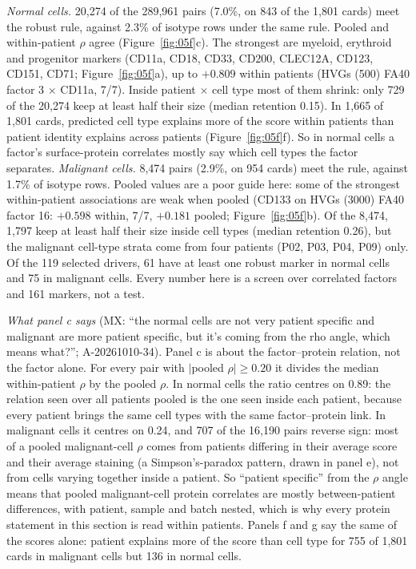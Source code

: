 \emph{Normal cells.} 20,274 of the 289,961 pairs (7.0\%, on 843 of the 1,801 cards) meet the robust rule, against 2.3\% of isotype rows under the same rule. Pooled and within-patient $\rho$ agree (Figure~\ref{fig:05f}c). The strongest are myeloid, erythroid and progenitor markers (CD11a, CD18, CD33, CD200, CLEC12A, CD123, CD151, CD71; Figure~\ref{fig:05f}a), up to $+0.809$ within patients (HVGs (500) FA40 factor 3 $\times$ CD11a, 7/7). Inside patient $\times$ cell type most of them shrink: only 729 of the 20,274 keep at least half their size (median retention 0.15). In 1,665 of 1,801 cards, predicted cell type explains more of the score within patients than patient identity explains across patients (Figure~\ref{fig:05f}f). So in normal cells a factor's surface-protein correlates mostly say which cell types the factor separates. \emph{Malignant cells.} 8,474 pairs (2.9\%, on 954 cards) meet the rule, against 1.7\% of isotype rows. Pooled values are a poor guide here: some of the strongest within-patient associations are weak when pooled (CD133 on HVGs (3000) FA40 factor 16: $+0.598$ within, 7/7, $+0.181$ pooled; Figure~\ref{fig:05f}b). Of the 8,474, 1,797 keep at least half their size inside cell types (median retention 0.26), but the malignant cell-type strata come from four patients (P02, P03, P04, P09) only. Of the 119 selected drivers, 61 have at least one robust marker in normal cells and 75 in malignant cells. Every number here is a screen over correlated factors and 161 markers, not a test.

\emph{What panel c says} (MX: ``the normal cells are not very patient specific and malignant are more patient specific, but it's coming from the rho angle, which means what?''; A-20261010-34). Panel c is about the factor--protein relation, not the factor alone. For every pair with $|$pooled $\rho| \geq 0.20$ it divides the median within-patient $\rho$ by the pooled $\rho$. In normal cells the ratio centres on 0.89: the relation seen over all patients pooled is the one seen inside each patient, because every patient brings the same cell types with the same factor--protein link. In malignant cells it centres on 0.24, and 707 of the 16,190 pairs reverse sign: most of a pooled malignant-cell $\rho$ comes from patients differing in their average score and their average staining (a Simpson's-paradox pattern, drawn in panel e), not from cells varying together inside a patient. So ``patient specific'' from the $\rho$ angle means that pooled malignant-cell protein correlates are mostly between-patient differences, with patient, sample and batch nested, which is why every protein statement in this section is read within patients. Panels f and g say the same of the scores alone: patient explains more of the score than cell type for 755 of 1,801 cards in malignant cells but 136 in normal cells.

